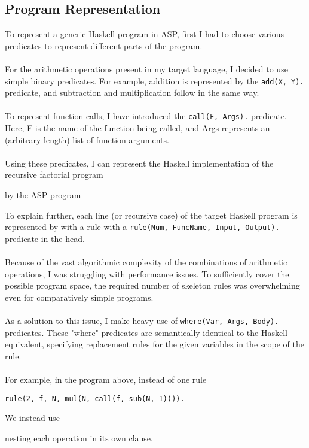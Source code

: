 \subsection{Program Representation}
To represent a generic Haskell program in ASP, first I had to choose various predicates to represent different parts of the program.\\ \\
For the arithmetic operations present in my target language, I decided to use simple binary predicates. For example, addition is represented by the \lstinline{add(X, Y).} predicate, and subtraction and multiplication follow in the same way. \\ \\
To represent function calls, I have introduced the \lstinline{call(F, Args).} predicate. Here, F is the name of the function being called, and Args represents an (arbitrary length) list of function arguments. \\ \\
Using these predicates, I can represent the Haskell implementation of the recursive factorial program

by the ASP program

To explain further, each line (or recursive case) of the target Haskell program is represented by with a rule with a \lstinline{rule(Num, FuncName, Input, Output).} predicate in the head. \\ \\
Because of the vast algorithmic complexity of the combinations of arithmetic operations, I was struggling with performance issues. To sufficiently cover the possible program space, the required number of skeleton rules was overwhelming even for comparatively simple programs. \\ \\
As a solution to this issue, I make heavy use of \lstinline{where(Var, Args, Body).} predicates. These "where" predicates are semantically identical to the Haskell equivalent, specifying replacement rules for the given variables in the scope of the rule. \\ \\
For example, in the program above, instead of one rule
\begin{lstlisting}
rule(2, f, N, mul(N, call(f, sub(N, 1)))).
\end{lstlisting}
We instead use

nesting each operation in its own clause.

